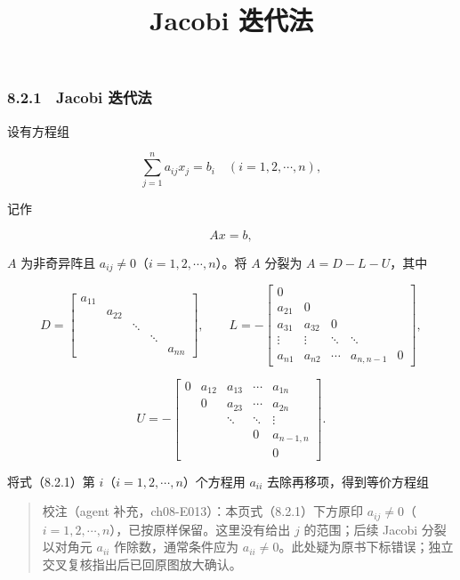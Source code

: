 \documentclass[
  10pt,
  fontset=fandol]{ctexart}
\title{Jacobi 迭代法}
\author{}
\date{}
\begin{document}
\maketitle

\subsubsection{8.2.1　Jacobi 迭代法}\label{jacobi-ux8fedux4ee3ux6cd5}

设有方程组

\[
\sum_{j=1}^n a_{ij}x_j=b_i\quad(i=1,2,\cdots,n),
\]

记作

\[
Ax=b,
\tag{8.2.1}
\]

\(A\) 为非奇异阵且 \(a_{ij}\neq0\)（\(i=1,2,\cdots,n\)）。将 \(A\) 分裂为 \(A=D-L-U\)，其中

\[
D=\begin{bmatrix}
a_{11}&&&&\\
&a_{22}&&&\\
&&\ddots&&\\
&&&\ddots&\\
&&&&a_{nn}
\end{bmatrix},\qquad
L=-\begin{bmatrix}
0&&&&\\
a_{21}&0&&&\\
a_{31}&a_{32}&0&&\\
\vdots&\vdots&\ddots&\ddots&\\
a_{n1}&a_{n2}&\cdots&a_{n,n-1}&0
\end{bmatrix},
\]

\[
U=-\begin{bmatrix}
0&a_{12}&a_{13}&\cdots&a_{1n}\\
&0&a_{23}&\cdots&a_{2n}\\
&&\ddots&\ddots&\vdots\\
&&&0&a_{n-1,n}\\
&&&&0
\end{bmatrix}.
\]

将式（8.2.1）第 \(i\)（\(i=1,2,\cdots,n\)）个方程用 \(a_{ii}\) 去除再移项，得到等价方程组

\begin{quote}
校注（agent 补充，ch08-E013）：本页式（8.2.1）下方原印 \(a_{ij}\neq0\)（\(i=1,2,\cdots,n\)），已按原样保留。这里没有给出 \(j\) 的范围；后续 Jacobi 分裂以对角元 \(a_{ii}\) 作除数，通常条件应为 \(a_{ii}\neq0\)。此处疑为原书下标错误；独立交叉复核指出后已回原图放大确认。
\end{quote}
\end{document}
